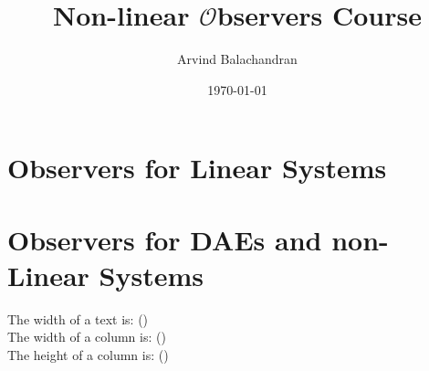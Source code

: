 \documentclass[a4paper]{book}
\title{\Large Non-linear $\mathcal{O}$bservers Course}
\author{Arvind Balachandran}
\date{\today}
\begin{document}
\maketitle
{}
\newpage
{}

\chapter{Observers for Linear Systems}

\clearpage
 
\clearpage

\clearpage

\clearpage

\clearpage

\clearpage




\clearpage

\clearpage

\clearpage

\clearpage

\clearpage

\chapter{Observers for DAEs and non-Linear Systems}

\clearpage 

\clearpage

\clearpage

\clearpage

\clearpage

\clearpage


\newpage
The width of a text is:
\prntlen{\textwidth} (\prntlen{\textwidth}) \\
The width of a column is:
\prntlen{\columnwidth} (\prntlen{\columnwidth}) \\
The height of a column is:
\prntlen{\textheight} (\prntlen{\textheight}) \\ 
\end{document}

